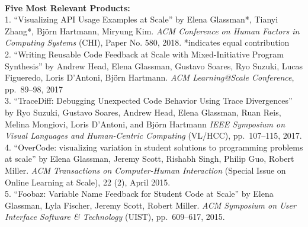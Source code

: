 \documentclass[11pt]{article}
\begin{document}



      
\\
{\bf Five Most Relevant Products:}\\
1. ``Visualizing API Usage Examples at Scale'' by Elena Glassman*, Tianyi Zhang*, Bj\"orn Hartmann, Miryung Kim. \emph{ACM Conference on Human Factors in Computing Systems} (CHI), Paper No. 580, 2018. *indicates equal contribution\\[2pt]
2. ``Writing Reusable Code Feedback at Scale with Mixed-Initiative Program Synthesis'' by
Andrew Head, Elena Glassman, Gustavo Soares, Ryo Suzuki, Lucas Figueredo, Loris D'Antoni, Bj\"orn Hartmann. {\em ACM Learning@Scale Conference}, pp.~89--98, 2017\\[2pt]
3. ``TraceDiff: Debugging Unexpected Code Behavior Using Trace Divergences'' by Ryo Suzuki, Gustavo Soares, Andrew Head, Elena Glassman, Ruan Reis, Melina Mongiovi, Loris D'Antoni, and Bj\"orn Hartmann \emph{IEEE Symposium on Visual Languages and Human-Centric Computing} (VL/HCC), pp.~107--115, 2017.\\[2pt]
4. ``OverCode: visualizing variation in student solutions to programming problems at scale'' by Elena Glassman, Jeremy Scott, Rishabh Singh, Philip Guo, Robert Miller. \emph{ACM Transactions on Computer-Human Interaction} ({\small Special Issue on Online Learning at Scale}), 22 (2), April 2015.\\[2pt]
5. ``Foobaz: Variable Name Feedback for Student Code at Scale'' by Elena Glassman, Lyla Fischer, Jeremy Scott, Robert Miller. \emph{ACM Symposium on User Interface Software \& Technology} (UIST), pp.~609--617, 2015.\\[2pt]
\end{document}
